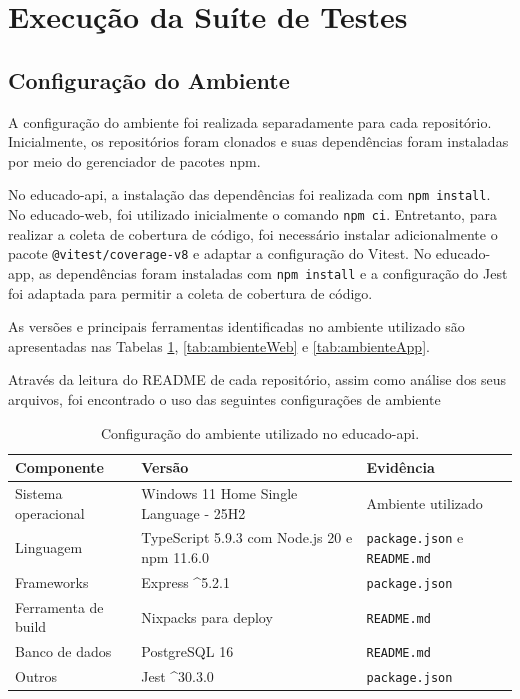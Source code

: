 \section{Execução da Suíte de Testes}
\label{sec:execucao}


\subsection{Configuração do Ambiente}

A configuração do ambiente foi realizada separadamente para cada repositório.
Inicialmente, os repositórios foram clonados 
e suas dependências foram instaladas por meio do gerenciador de pacotes npm.

No educado-api, a instalação das dependências foi realizada com \texttt{npm install}.
No educado-web, foi utilizado inicialmente o comando \texttt{npm ci}.
Entretanto, para realizar a coleta de cobertura de código, 
foi necessário instalar adicionalmente o pacote \texttt{@vitest/coverage-v8} 
e adaptar a configuração do Vitest.
No educado-app, as dependências foram instaladas com \texttt{npm install} 
e a configuração do Jest foi adaptada para permitir a coleta de cobertura de código.

As versões e principais ferramentas identificadas no ambiente utilizado são apresentadas nas Tabelas \ref{tab:ambienteApi}, \ref{tab:ambienteWeb} e \ref{tab:ambienteApp}.

Através da leitura do README de cada repositório, 
assim como análise dos seus arquivos, 
foi encontrado o uso das seguintes configurações de ambiente

\begin{table}[H]
\centering
\caption{Configuração do ambiente utilizado no educado-api.}
\label{tab:ambienteApi}
\begin{tabularx}{\textwidth}{l X X}
\toprule
\textbf{Componente} & \textbf{Versão} & \textbf{Evidência}\\
\midrule
Sistema operacional & Windows 11 Home Single Language - 25H2 & Ambiente utilizado \\
Linguagem & TypeScript 5.9.3 com Node.js 20 e npm 11.6.0 & \texttt{package.json} e \texttt{README.md} \cite{educado-repos} \\
Frameworks & Express \textasciicircum{}5.2.1 &  \texttt{package.json} \cite{educado-repos} \\
Ferramenta de build & Nixpacks para deploy &  \texttt{README.md} \cite{educado-repos}\\
Banco de dados & PostgreSQL 16 &  \texttt{README.md} \cite{educado-repos}\\
Outros & Jest \textasciicircum{}30.3.0 & \texttt{package.json} \cite{educado-repos} \\
\bottomrule
\end{tabularx}
\end{table}

